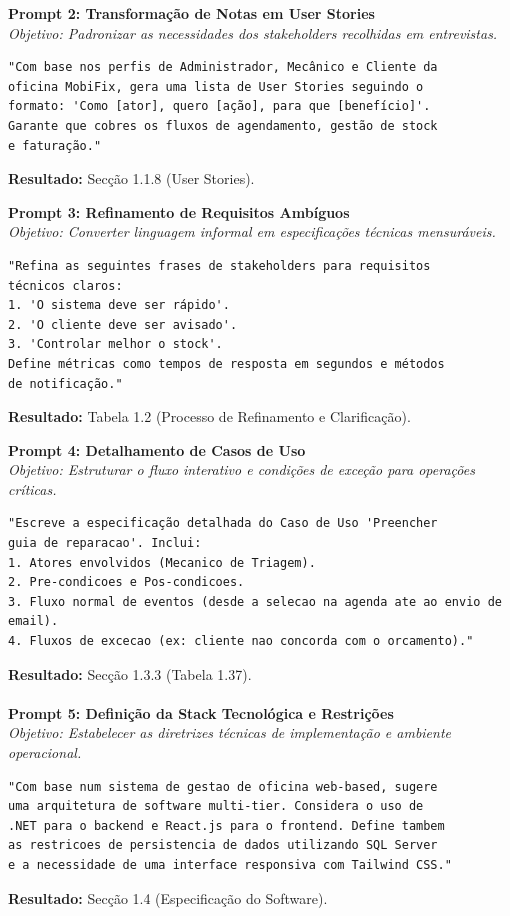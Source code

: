 \documentclass[a4paper,12pt]{scrreprt}
\begin{document}
\vspace{1em}

\noindent\textbf{Prompt 2: Transformação de Notas em User Stories} \\
\textit{Objetivo: Padronizar as necessidades dos stakeholders recolhidas em entrevistas.}
\begin{lstlisting}
"Com base nos perfis de Administrador, Mecânico e Cliente da 
oficina MobiFix, gera uma lista de User Stories seguindo o
formato: 'Como [ator], quero [ação], para que [benefício]'. 
Garante que cobres os fluxos de agendamento, gestão de stock 
e faturação."
\end{lstlisting}
\textbf{Resultado:} Secção 1.1.8 (User Stories).

\vspace{1em}
\noindent\textbf{Prompt 3: Refinamento de Requisitos Ambíguos} \\
\textit{Objetivo: Converter linguagem informal em especificações técnicas mensuráveis.}
\begin{lstlisting}
"Refina as seguintes frases de stakeholders para requisitos 
técnicos claros: 
1. 'O sistema deve ser rápido'.
2. 'O cliente deve ser avisado'.
3. 'Controlar melhor o stock'. 
Define métricas como tempos de resposta em segundos e métodos
de notificação."
\end{lstlisting}
\textbf{Resultado:} Tabela 1.2 (Processo de Refinamento e Clarificação).

\vspace{1em}
\newpage
\noindent\textbf{Prompt 4: Detalhamento de Casos de Uso} \\
\textit{Objetivo: Estruturar o fluxo interativo e condições de exceção para operações críticas.}
\begin{lstlisting}
"Escreve a especificação detalhada do Caso de Uso 'Preencher 
guia de reparacao'. Inclui:
1. Atores envolvidos (Mecanico de Triagem).
2. Pre-condicoes e Pos-condicoes.
3. Fluxo normal de eventos (desde a selecao na agenda ate ao envio de email).
4. Fluxos de excecao (ex: cliente nao concorda com o orcamento)."
\end{lstlisting}
\textbf{Resultado:} Secção 1.3.3 (Tabela 1.37).\vspace{1em}
\paragraph{}
\noindent\textbf{Prompt 5: Definição da Stack Tecnológica e Restrições} \\
\textit{Objetivo: Estabelecer as diretrizes técnicas de implementação e ambiente operacional.}
\begin{lstlisting}
"Com base num sistema de gestao de oficina web-based, sugere 
uma arquitetura de software multi-tier. Considera o uso de 
.NET para o backend e React.js para o frontend. Define tambem 
as restricoes de persistencia de dados utilizando SQL Server 
e a necessidade de uma interface responsiva com Tailwind CSS."
\end{lstlisting}
\textbf{Resultado:} Secção 1.4 (Especificação do Software).
\end{document}
